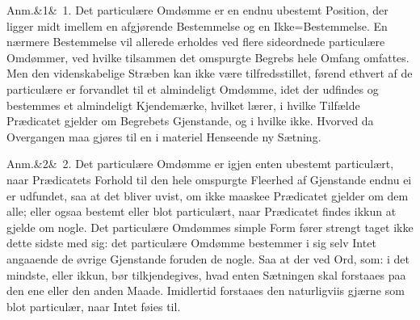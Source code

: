 \documentclass[12pt]{book}
\def\sperr#1{#1}%
\def\textit#1{#1}%
\def\emph#1{#1}%
\newcommand{\sperr}[1]{\textls[180]{#1}}
\newcommand{\anm}[1]{%
  \par\vspace{0.5\baselineskip}%
  \noindent\hspace{\parindent}\sperr{Anm.}\ifx&#1&\else~\textit{#1}.\fi
  \enspace\ignorespaces
}
\newcommand{\opage}[1]{\marginnote{\footnotesize\textit{[#1]}}}
\begin{document}
\anm{1} Det particulære Omdømme er en endnu ubestemt Position, der ligger midt imellem
en afgjørende Bestemmelse og en Ikke=Bestemmelse. En nærmere Bestemmelse vil allerede
erholdes ved flere sideordnede particulære Omdømmer, ved hvilke tilsammen det omspurgte
Begrebs hele Omfang omfattes. Men den videnskabelige Stræben kan ikke være
tilfredsstillet, førend ethvert af de particulære er forvandlet til et almindeligt
Omdømme, idet der udfindes og bestemmes et almindeligt Kjendemærke, hvilket lærer, i
hvilke Tilfælde Prædicatet gjelder om Begrebets Gjenstande, og i hvilke ikke. Hvorved
da Overgangen maa gjøres til en i materiel Henseende ny Sætning.

\anm{2} Det particulære Omdømme er igjen enten \emph{ubestemt particulært}, naar
Prædicatets Forhold til den hele omspurgte \emph{Fleerhed} af Gjenstande endnu ei er
udfundet, saa at det bliver uvist, om ikke maaskee Prædicatet gjelder om dem alle;
eller ogsaa \emph{bestemt eller blot particulært}, naar Prædicatet findes \emph{ikkun}
at gjelde om nogle. Det particulære Omdømmes simple Form fører strengt taget ikke dette
sidste med sig: det particulære Omdømme bestemmer \emph{i sig selv} Intet angaaende de
øvrige Gjenstande foruden de nogle. Saa at der ved Ord, som: \emph{i det mindste},
eller \emph{ikkun}, bør tilkjendegives, hvad enten
\opage{280} Sætningen skal forstaaes paa den ene eller den anden Maade. Imidlertid forstaaes den
naturligviis gjærne som blot particulær, naar Intet føies til.
\end{document}
